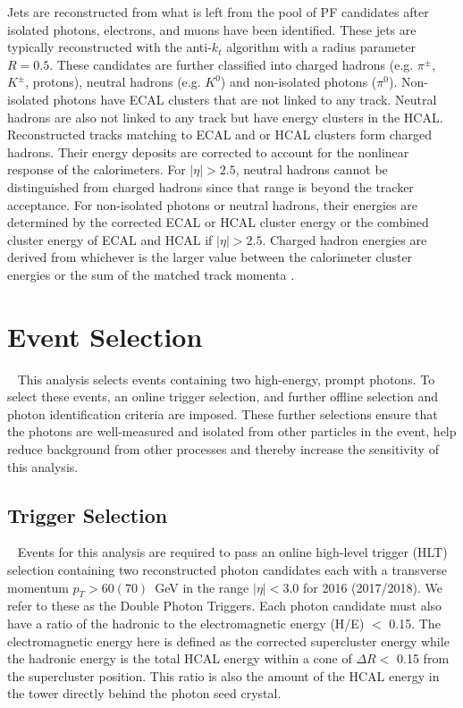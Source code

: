 Jets are reconstructed from what is left from the pool of PF candidates after isolated photons, electrons, and muons have been identified. These jets are typically reconstructed with the anti-$k_{t}$ algorithm \cite{antikt_algorithm} with a radius parameter $R=0.5$. These candidates are further classified into charged hadrons (e.g. $\pi^{\pm}$, $K^{\pm}$, protons), neutral hadrons (e.g. $K^{0}$) and non-isolated photons ($\pi^{0}$). Non-isolated photons have ECAL clusters that are not linked to any track. Neutral hadrons are also not linked to any track but have energy clusters in the HCAL. Reconstructed tracks matching to ECAL and or HCAL clusters form charged hadrons. Their energy deposits are corrected to account for the nonlinear response of the calorimeters. For $|\eta| > 2.5$, neutral hadrons cannot be distinguished from charged hadrons since that range is beyond the tracker acceptance.  For non-isolated photons or neutral hadrons, their energies are determined by the corrected ECAL or HCAL cluster energy or the combined cluster energy of ECAL and HCAL if $|\eta| > 2.5$. Charged hadron energies are derived from whichever is the larger value between the calorimeter cluster energies or the sum of the matched track momenta \cite{Strologas:2287326}. 

\section{Event Selection}~\label{sec:EventSelection}
This analysis selects events containing two high-energy, prompt photons. To select these events, an online trigger selection, and further offline selection and photon identification criteria are imposed. These further selections ensure that the  photons are well-measured and isolated from other particles in the event, help reduce background from other processes and thereby increase the sensitivity of this analysis. 

\subsection{Trigger Selection}~\label{sec:TriggerSelection}
Events for this analysis are required to pass an online high-level trigger (HLT) selection containing two reconstructed photon candidates each with a transverse momentum $p_{T} > 60 (70)$~GeV in the range $|\eta| < 3.0$ for 2016 (2017/2018). We refer to these as the Double Photon Triggers. Each photon candidate must also have a ratio of the hadronic to the electromagnetic energy (H/E) $<$ 0.15. The electromagnetic energy here is defined as the corrected supercluster energy while the hadronic energy is the total HCAL energy within a cone of $\Delta R <$  0.15 from the supercluster position. This ratio is also the amount of the HCAL energy in the tower directly behind the photon seed crystal. 

